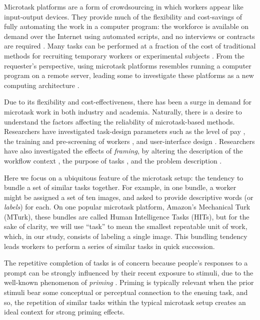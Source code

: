 \documentclass[12pt]{article}
\begin{document}
Microtask platforms are a form of crowdsourcing in which workers appear like 
input-output devices.  They provide much of the flexibility and 
cost-savings of fully automating the work in a computer program: 
the workforce is available on demand over the Internet using automated 
scripts, and  no interviews or contracts are required 
\cite{wolfson2011look,5543192}.  Many tasks
can be performed at a fraction of the cost of traditional methods for 
recruiting temporary workers or experimental subjects
\cite{Berinsky2012351,paolacci2010running,ranade2012crowdsource}.
From the requester's perspective, using microtask platforms resembles
running a computer program on a remote server, leading some to investigate
these platforms as a new computing architecture \cite{5543192,little2010turkit,minder2012crowdlang,kittur2011crowdforge}.

Due to its flexibility and cost-effectiveness, 
there has been a surge in demand for microtask work
in both industry and academia\cite{wolfson2011look,Berinsky2012351}.  
Naturally, there is a desire to understand the factors affecting the 
reliability of microtask-based methods.  Researchers have investigated 
task-design parameters such as the 
level of pay \cite{kazai2013analysis}, the training and pre-screening of 
workers \cite{le2010ensuring,paolacci2010running,kazai2013analysis}, 
and user-interface design \cite{Finnerty2013}.  
Researchers have also investigated the effects of \textit{framing}, 
by altering the description of the workflow context 
\cite{Kinnaird2012281}, the purpose of tasks 
\cite{chandler2013breaking}, and the problem description
\cite{thibodeau2013natural}.  

Here we focus on a ubiquitous feature of the microtask setup: the tendency
to bundle a set of similar tasks together. 
For example, in one bundle, a worker might be assigned a set of ten images, 
and asked to provide descriptive words 
(or \textit{labels}) for each.  
On one popular microtask platform,
Amazon's Mechanical Turk (MTurk), these bundles are called Human 
Intelligence Tasks (HITs), but for the sake of clarity, we will use 
``task'' to mean the smallest repeatable unit of work, which, in our study, 
consists of labeling a single image.  This bundling tendency leads
workers to perform a series of similar tasks in quick succession.

The repetitive completion of tasks is of concern because people's responses
to a prompt can be strongly influenced by their recent exposure to stimuli,
due to the well-known phenomenon of \textit{priming} 
\cite{BJOP1796,No2007,beller1971priming}.  Priming is typically relevant when 
the prior stimuli bear some conceptual or perceptual connection to the 
ensuing task\cite{Gass1999549,sohn2001task}, and so, the repetition of 
similar tasks within the typical microtask setup creates an ideal context for 
strong priming effects.
\end{document}
